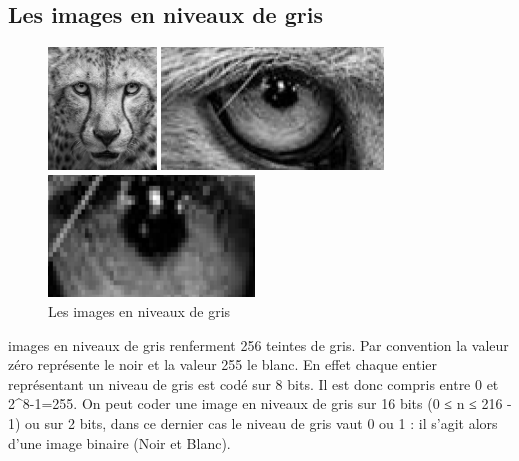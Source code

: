 \documentclass[12pt,a4paper]{report}
\numberwithin{equation}{subsection}
\numberwithin{equation}{section}
\begin{document}
\subsection{Les images en niveaux de gris}
\begin{figure}[!h]
    \centering
    \begin{minipage}[b]{0.3\textwidth}
        \includegraphics[height=3.25cm,width=3.5cm \textwidth]{gris.png}
    \end{minipage}
    \begin{minipage}[b]{0.3\textwidth}
        \includegraphics[height=3.25cm ,width=3.5cm \textwidth]{gray3.png}
    \end{minipage}
    \begin{minipage}[b]{0.3\textwidth}
        \includegraphics[height=3.25cm, width=3.5cm \textwidth]{gray2.png}
    \end{minipage}
    \caption{Les images en niveaux de gris}
\end{figure}
\raggedrightLes images en niveaux de gris renferment 256 teintes de gris. Par convention la valeur zéro représente le noir et la valeur 255 le blanc. En effet chaque entier représentant un niveau de gris est codé sur 8 bits. 
\newline Il est donc compris entre 0 et 2^{8}-1=255. On peut coder une image en niveaux de gris sur 16 bits (0 ≤ n ≤ 216 - 1) ou sur 2 bits, dans ce dernier cas le niveau de gris vaut 0 ou 1 : il s'agit alors d'une image binaire (Noir et Blanc).
 
\end{document}
